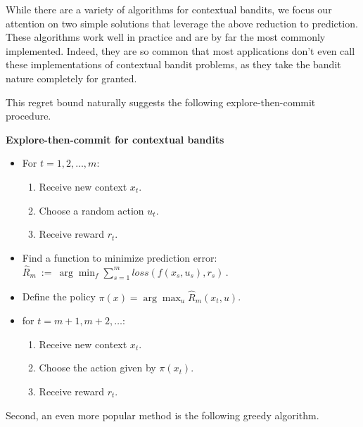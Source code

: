 \documentclass{tufte-book}
\begin{document}
While there are a variety of algorithms for contextual bandits, we focus
our attention on two simple solutions that leverage the above reduction
to prediction. These algorithms work well in practice and are by far the
most commonly implemented. Indeed, they are so common that most
applications don't even call these implementations of contextual bandit
problems, as they take the bandit nature completely for granted.

This regret bound naturally suggests the following explore-then-commit
procedure.

\begin{Algorithm}

\textbf{Explore-then-commit for contextual bandits}

\begin{itemize}
\tightlist
\item
  For \(t=1,2,\ldots, m\):

  \begin{enumerate}
  \def\labelenumi{\arabic{enumi}.}
  \tightlist
  \item
    Receive new context \(x_t\).
  \item
    Choose a random action \(u_t\).
  \item
    Receive reward \(r_t\).
  \end{enumerate}
\item
  Find a function to minimize prediction error:
  \(\textstyle\hat{R}_m~:=~\arg\min_f \sum_{s=1}^{m} \mathit{loss}(f(x_s,u_s),r_s)\,.\)
\item
  Define the policy \(\pi(x) = \arg\max_u \hat{R}_m(x_t,u)\).
\item
  for \(t=m+1,m+2,\ldots\):

  \begin{enumerate}
  \def\labelenumi{\arabic{enumi}.}
  \tightlist
  \item
    Receive new context \(x_t\).
  \item
    Choose the action given by \(\pi(x_t)\).
  \item
    Receive reward \(r_t\).
  \end{enumerate}
\end{itemize}

\end{Algorithm}

Second, an even more popular method is the following greedy
algorithm.
\end{document}
